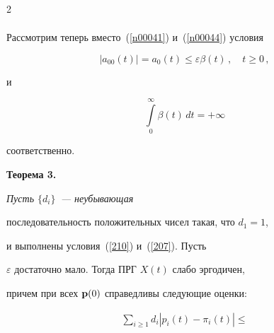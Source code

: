 \begin{multicols}{2}
\begin{align*}


\end{align*}





\vspace*{-2pt}








Рассмотрим теперь вместо~(\ref{n00041}) и~(\ref{n00044}) условия


\begin{equation}


|a_{00}(t)| = a_0(t) \le \varepsilon \beta (t)\,,\quad t \ge 0\,,


\label{210}


\end{equation}


 и


\begin{equation} 


\int\limits_0^{\infty} \beta (t)\, dt = +\infty


\label{207} 


\end{equation}


соответственно.





\medskip





\noindent


{\bf Теорема 3. } {\it Пусть $\{d_i\}$~--- неубывающая


последовательность положительных чисел такая, что $d_1=1$, 


и выполнены условия~(\ref{210}) и~(\ref{207}). Пусть


$\varepsilon$ достаточно мало. Тогда ПРГ $X(t)$ слабо эргодичен,


причем при всех ${\bf p}(0)$ справедливы следующие оценки:








\vspace*{-1pt}





\noindent


\begin{multline}


\sum_{i \ge 1} d_i \left|p_i(t) - \pi_i(t)\right|  \le{}\\[-2pt]



\end{multline}}
\end{multicols}
